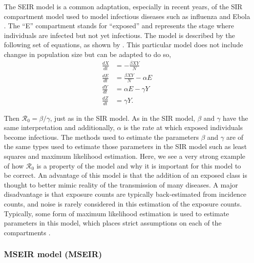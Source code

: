 \documentclass[12pt]{article}
\newcommand{\rr}{\ensuremath{\mathcal{R}_0}}
\begin{document}
The SEIR model is a common adaptation, especially in recent years, of the SIR compartment model used to model infectious diseases such as influenza and Ebola \citep{mills2004,althaus2014}.  The ``E'' compartment stands for ``exposed'' and represents the stage where individuals are infected but not yet infectious.  The model is described by the following set of equations, as shown by \cite{cintronarias2009}.  This particular model  does not include changse in population size but can be adapted to do so,
\begin{align*}
  \frac{dX}{dt} &= - \frac{\beta XY}{N} \\
  \frac{dE}{dt} &= \frac{\beta XY}{N}  - \alpha E\\
  \frac{dY}{dt} &= \alpha E - \gamma Y \\
  \frac{dZ}{dt} &= \gamma Y.
\end{align*}

Then $\rr = \beta / \gamma$, just as in the SIR model.  As in the SIR model, $\beta$ and $\gamma$ have the same interpretation and additionally, $\alpha$ is the rate at which exposed individuals become infectious.  The methods used to estimate the parameters $\beta$ and $\gamma$ are of the same types used to estimate those parameters in the SIR model such as least squares and maximum likelihood estimation.  Here, we see a very strong example of how $\rr$ is a property of the model and why it is important for this model to be correct.  An advantage of this model is that the addition of an exposed class is thought to better mimic reality of the transmission of many diseases.  A major disadvantage is that exposure counts are typically back-estimated from incidence counts, and noise is rarely considered in this estimation of the exposure counts.   Typically, some form of maximum likelihood estimation is used to estimate parameters in this model, which places strict assumptions on each of the compartments \citep{althaus2014}.

\subsubsection{MSEIR model (MSEIR)}
\label{sec:mseir-model-mseir}
\end{document}
